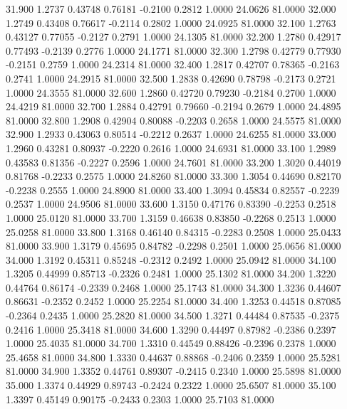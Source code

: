   31.900   1.2737   0.43748   0.76181  -0.2100   0.2812   1.0000  24.0626  81.0000
  32.000   1.2749   0.43408   0.76617  -0.2114   0.2802   1.0000  24.0925  81.0000
  32.100   1.2763   0.43127   0.77055  -0.2127   0.2791   1.0000  24.1305  81.0000
  32.200   1.2780   0.42917   0.77493  -0.2139   0.2776   1.0000  24.1771  81.0000
  32.300   1.2798   0.42779   0.77930  -0.2151   0.2759   1.0000  24.2314  81.0000
  32.400   1.2817   0.42707   0.78365  -0.2163   0.2741   1.0000  24.2915  81.0000
  32.500   1.2838   0.42690   0.78798  -0.2173   0.2721   1.0000  24.3555  81.0000
  32.600   1.2860   0.42720   0.79230  -0.2184   0.2700   1.0000  24.4219  81.0000
  32.700   1.2884   0.42791   0.79660  -0.2194   0.2679   1.0000  24.4895  81.0000
  32.800   1.2908   0.42904   0.80088  -0.2203   0.2658   1.0000  24.5575  81.0000
  32.900   1.2933   0.43063   0.80514  -0.2212   0.2637   1.0000  24.6255  81.0000
  33.000   1.2960   0.43281   0.80937  -0.2220   0.2616   1.0000  24.6931  81.0000
  33.100   1.2989   0.43583   0.81356  -0.2227   0.2596   1.0000  24.7601  81.0000
  33.200   1.3020   0.44019   0.81768  -0.2233   0.2575   1.0000  24.8260  81.0000
  33.300   1.3054   0.44690   0.82170  -0.2238   0.2555   1.0000  24.8900  81.0000
  33.400   1.3094   0.45834   0.82557  -0.2239   0.2537   1.0000  24.9506  81.0000
  33.600   1.3150   0.47176   0.83390  -0.2253   0.2518   1.0000  25.0120  81.0000
  33.700   1.3159   0.46638   0.83850  -0.2268   0.2513   1.0000  25.0258  81.0000
  33.800   1.3168   0.46140   0.84315  -0.2283   0.2508   1.0000  25.0433  81.0000
  33.900   1.3179   0.45695   0.84782  -0.2298   0.2501   1.0000  25.0656  81.0000
  34.000   1.3192   0.45311   0.85248  -0.2312   0.2492   1.0000  25.0942  81.0000
  34.100   1.3205   0.44999   0.85713  -0.2326   0.2481   1.0000  25.1302  81.0000
  34.200   1.3220   0.44764   0.86174  -0.2339   0.2468   1.0000  25.1743  81.0000
  34.300   1.3236   0.44607   0.86631  -0.2352   0.2452   1.0000  25.2254  81.0000
  34.400   1.3253   0.44518   0.87085  -0.2364   0.2435   1.0000  25.2820  81.0000
  34.500   1.3271   0.44484   0.87535  -0.2375   0.2416   1.0000  25.3418  81.0000
  34.600   1.3290   0.44497   0.87982  -0.2386   0.2397   1.0000  25.4035  81.0000
  34.700   1.3310   0.44549   0.88426  -0.2396   0.2378   1.0000  25.4658  81.0000
  34.800   1.3330   0.44637   0.88868  -0.2406   0.2359   1.0000  25.5281  81.0000
  34.900   1.3352   0.44761   0.89307  -0.2415   0.2340   1.0000  25.5898  81.0000
  35.000   1.3374   0.44929   0.89743  -0.2424   0.2322   1.0000  25.6507  81.0000
  35.100   1.3397   0.45149   0.90175  -0.2433   0.2303   1.0000  25.7103  81.0000
